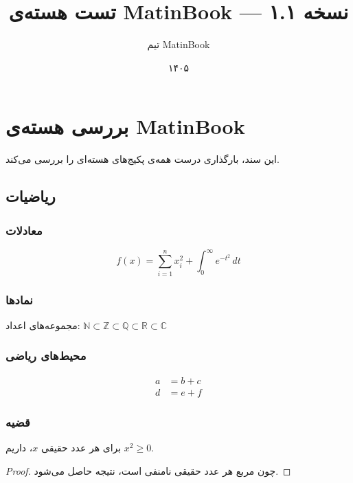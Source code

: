 \documentclass{matinbook}
\title{تست هسته‌ی MatinBook — نسخه ۱.۱}
\author{تیم MatinBook}
\date{۱۴۰۵}
\begin{document}
\maketitle

\chapter{بررسی هسته‌ی MatinBook}
\label{chap:test-core}

این سند، بارگذاری درست همه‌ی پکیج‌های هسته‌ای را بررسی می‌کند.

\section{ریاضیات}
\label{sec:math}

\subsection{معادلات}

\begin{equation}
    \label{eq:core-test}
    f(x) = \sum_{i=1}^{n} x_i^2 + \int_{0}^{\infty} e^{-t^2} \, dt
\end{equation}

\subsection{نمادها}

مجموعه‌های اعداد: $\mathbb{N} \subset \mathbb{Z} \subset \mathbb{Q} \subset \mathbb{R} \subset \mathbb{C}$

\subsection{محیط‌های ریاضی}

\begin{align}
    a &= b + c \\
    d &= e + f
\end{align}

\subsection{قضیه}

\begin{theorem}
    برای هر عدد حقیقی $x$، داریم $x^2 \geq 0$.
\end{theorem}

\begin{proof}
    چون مربع هر عدد حقیقی نامنفی است، نتیجه حاصل می‌شود.
\end{proof}
\end{document}
